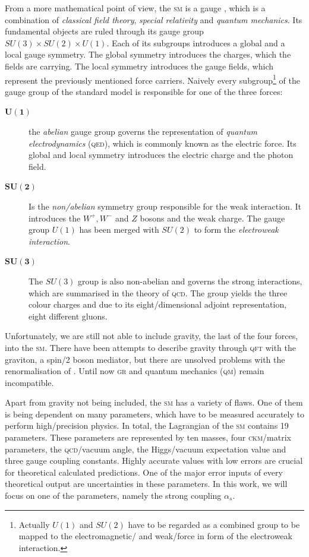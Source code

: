 \documentclass[../../index.tex]{subfiles}
\begin{document}
From a more mathematical point of view, the \textsc{sm} is a gauge
, which is a combination of \textit{classical
  field theory}, \textit{special relativity} and \textit{quantum mechanics}. Its
fundamental objects are ruled through its gauge group \(SU(3)\times SU(2)\times
U(1)\). Each of its subgroups introduces a global and a local gauge symmetry.
The global symmetry introduces the charges, which the fields are carrying. The
local symmetry introduces the gauge fields, which represent the previously
mentioned force carriers. Naively every subgroup\footnote{Actually \(U(1)\) and
  \(SU(2)\) have to be regarded as a combined group to be mapped to the
  electromagnetic\-/ and weak\-/force in form of the electroweak interaction.}
of the gauge group of the standard model is responsible for one of the three
forces:
\begin{description}
\item[\(\bm{U(1)}\)] the \textit{abelian} gauge group governs the representation
  of \textit{quantum electrodynamics} (\textsc{qed}), which is commonly known as
  the electric force. Its global and local symmetry introduces the electric
  charge and the photon field.
\item[\(\bm{SU(2)}\)] Is the \textit{non\-/abelian} symmetry group responsible
  for the weak interaction. It introduces the \(W^+,W^-\) and \(Z\) bosons and
  the weak charge. The gauge group \(U(1)\) has been merged with \(SU(2)\) to
  form the \textit{electroweak interaction}.
\item[\(\bm{SU(3)}\)] The \(SU(3)\) group is also non-abelian and governs the
  strong interactions, which are summarised in the theory of \textsc{qcd}. The
  group yields the three colour charges and due to its eight\-/dimensional
  adjoint representation, eight different gluons.
\end{description}
Unfortunately, we are still not able to include gravity, the last of the four
forces, into the \textsc{sm}. There have been attempts to describe gravity
through \textsc{qft} with the graviton, a spin\-/2 boson mediator, but there are
unsolved problems with the renormalisation of .
Until now \textsc{gr} and quantum mechanics (\textsc{qm}) remain incompatible.

Apart from gravity not being included, the \textsc{sm} has a variety of flaws.
One of them is being dependent on many parameters, which have to be measured
accurately to perform high\-/precision physics. In total, the Lagrangian of the
\textsc{sm} contains 19 parameters. These parameters are represented by ten
masses, four \textsc{ckm}\-/matrix parameters, the \textsc{qcd}\-/vacuum angle,
the Higgs\-/vacuum expectation value and three gauge coupling constants. Highly
accurate values with low errors are crucial for theoretical calculated
predictions. One of the major error inputs of every theoretical output are
uncertainties in these parameters. In this work, we will focus on one of the
parameters, namely the strong coupling \(\alpha_s\).
\end{document}
